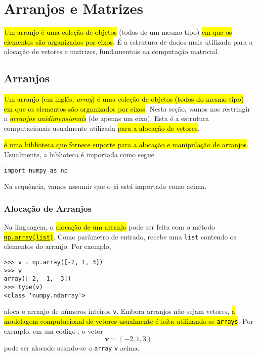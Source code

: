
\chapter{Arranjos e Matrizes}\label{cap_arr}
\thispagestyle{fancy}

\hl{Um arranjo é uma coleção de objetos} (todos de um mesmo tipo) \hl{em que os elementos são organizados por eixos}. É a estrutura de dados mais utilizada para a alocação de vetores e matrizes, fundamentais na computação matricial.

\section{Arranjos}\label{cap_arr_sec_arr}

\hl{Um arranjo (em inglês, \textit{array}) é uma coleção de objetos (todos do mesmo tipo) em que os elementos são organizados por eixos}. Nesta seção, vamos nos restringir a \hl{\emph{arranjos unidimensionais}} (de apenas um eixo). Esta é a estrutura computacionais usualmente utilizada \hl{para a alocação de vetores}.

\hl{{\numpy} é uma biblioteca {\python} que fornece suporte para a alocação e manipulação de arranjos}. Usualmente, a biblioteca é importada como segue
\begin{lstlisting}
import numpy as np
\end{lstlisting}
Na sequência, vamos assumir que o {\numpy} já está importado como acima.

\subsection{Alocação de Arranjos}

Na linguagem, a \hl{alocação de um arranjo} pode ser feita com o método \hl{{\href{https://numpy.org/doc/stable/reference/generated/numpy.array.html}{\lstinline+np.array(list)+}}}. Como parâmetro de entrada, recebe uma \lstinline+list+ contendo os elementos do arranjo. Por exemplo,
\begin{lstlisting}
>>> v = np.array([-2, 1, 3])
>>> v
array([-2,  1,  3])
>>> type(v)
<class 'numpy.ndarray'>
\end{lstlisting}
aloca o arranjo de números inteiros \lstinline+v+. Embora arranjos não sejam vetores, \hl{a modelagem computacional de vetores usualmente é feita utilizando-se {\lstinline+arrays+}}. Por exemplo, em um código {\python}, o vetor
\begin{equation}
  \pmb{v} = (-2, 1, 3)
\end{equation}
pode ser alocado usando-se o \lstinline+array+ \lstinline+v+ acima.

